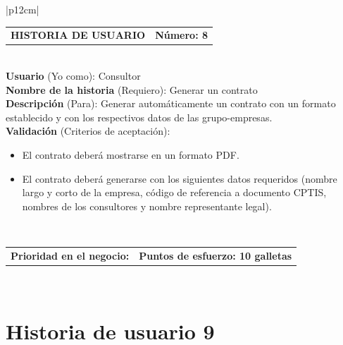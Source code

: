 \documentclass[11pt,letterpaper]{report}
\begin{document}
	\begin{center}	
		\begin{tabular}{|p{12cm}|}
			\hline
			\begin{tabular}{c|c}
				\textbf{HISTORIA DE USUARIO} & \textbf{Número: 8} \\
			\end{tabular} \\ \hline
			\textbf{Usuario} (Yo como): Consultor \\ \hline
			\textbf{Nombre de la historia} (Requiero): Generar un contrato \\ \hline
			\textbf{Descripción} (Para): Generar automáticamente un contrato con un formato establecido y con los respectivos datos de las grupo-empresas.\\ \hline
			\textbf{Validación} (Criterios de aceptación): \\
			\begin{minipage}{12cm}
				\begin{itemize}
					\item El contrato deberá mostrarse en un formato PDF.
					\item El contrato deberá generarse con los siguientes datos requeridos (nombre largo y corto de la empresa, código de referencia a documento CPTIS, nombres de los consultores y nombre representante legal).
				\end{itemize}
			\end{minipage} \\ \hline
			\begin{tabular}{p{6cm}|c}
				\textbf{Prioridad en el negocio: } & \textbf{Puntos de esfuerzo: 10 galletas} \\
			\end{tabular} \\ \hline
		\end{tabular}
	\end{center}
	
	\section{Historia de usuario 9}
	
\end{document}
